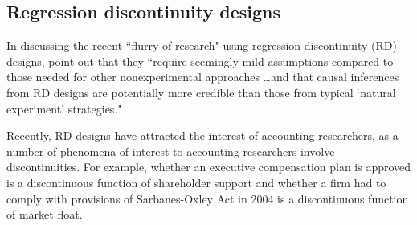 \documentclass[11pt,reqno,titlepage]{amsart}
\begin{document}
\begin{doublespace}

\subsection{Regression discontinuity designs}
In discussing the recent ``flurry of research" using regression discontinuity (RD) designs, \citet[p.\,282]{Lee:2010hya} point out that they ``require seemingly mild assumptions compared to those needed for other nonexperimental approaches \dots and that causal inferences from RD designs are potentially more credible than those from typical `natural experiment' strategies."

Recently, RD designs have attracted the interest of accounting researchers, as a number of phenomena of interest to accounting researchers involve discontinuities. For example, whether an executive compensation plan is approved is a discontinuous function of shareholder support \citet{Armstrong:2013io} and whether a firm had to comply with provisions of Sarbanes-Oxley Act in 2004 \citep{Iliev:2010ic} is a discontinuous function of market float.


\end{doublespace}
\end{document}
